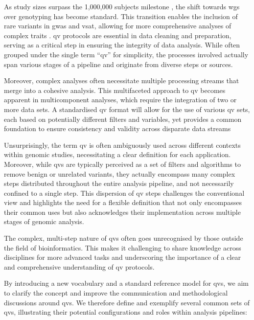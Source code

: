 As study sizes surpass the 1,000,000 subjects milestone \cite{lee2018gene, jansen2019genome}, the shift towards \ac{wgs} over genotyping has become standard. 
This transition enables the inclusion of rare variants in \ac{gwas} and \ac{vsat}, allowing for more comprehensive analyses of complex traits \cite{manolio2009finding, young2019solving}. 
\ac{qv} protocols are essential in data cleaning and preparation, serving as a critical step in ensuring the integrity of data analysis. 
While often grouped under the single term ``\ac{qv}'' for simplicity, the processes involved actually span various stages of a pipeline and originate from diverse steps or sources.

Moreover, complex analyses often necessitate multiple processing streams that merge into a cohesive analysis. 
This multifaceted approach to \ac{qv} becomes apparent in multicomponent analyses, which require the integration of two or more data sets. 
A standardised \ac{qv} format will allow for the use of various \ac{qv} sets, each based on potentially different filters and variables, yet provides a common foundation to ensure consistency and validity across disparate data streams

Unsurprisingly, the term \ac{qv} is often ambiguously used across different contexts within genomic studies, necessitating a clear definition for each application. 
Moreover, while \ac{qv}s are typically perceived as a set of filters and algorithms to remove benign or unrelated variants, they actually encompass many complex steps distributed throughout the entire analysis pipeline, and not necessarily confined to a single step. 
This dispersion of \ac{qv} steps challenges the conventional view and highlights the need for a flexible definition that not only encompasses their common uses but also acknowledges their implementation across multiple stages of genomic analysis.

The complex, multi-step nature of \ac{qv}s often goes unrecognised by those outside the field of bioinformatics.
This makes it challenging to share knowledge across disciplines for more advanced tasks and underscoring the importance of a clear and comprehensive understanding of \ac{qv} protocols.

By introducing a new vocabulary and a standard reference model for \ac{qv}s, we aim to clarify the concept and improve the communication and methodological discussions around \ac{qv}s. 
We therefore define and exemplify several common sets of \ac{qv}s, illustrating their potential configurations and roles within analysis pipelines:

